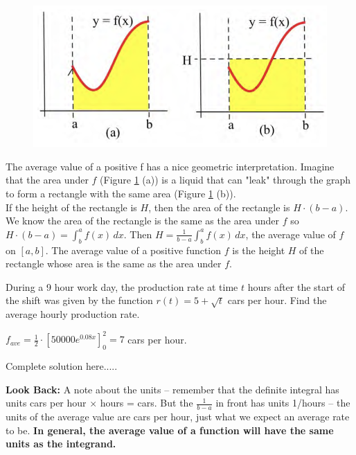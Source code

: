 \begin{figure}[h!]
    \centering
    \includegraphics[scale=0.5]{images/defIntgApp/geometricInterpret.png}
    \caption{}
    \label{fig:geometricInterpret}
\end{figure}

\noindent The average value of a positive f has a nice geometric interpretation. Imagine that the area under $f$ (Figure \ref{fig:geometricInterpret} (a)) is a liquid that can "leak" through the graph to form a rectangle with the same area (Figure \ref{fig:geometricInterpret} (b)).\\

\noindent If the height of the rectangle is $H$, then the area of the rectangle is $H\cdot (b-a)$. We know the area of the rectangle is the same as the area under $f$ so $H\cdot (b-a)=\displaystyle\int_b^a f(x)\,dx$. Then $H=\displaystyle \frac{1}{b-a}\int_b^a f(x)\,dx$, the average value of $f$ on $[a,b]$. The average value of a positive function $f$ is the height $H$ of the rectangle whose area is the same as the area under $f$.

\begin{example}
During a 9 hour work day, the production rate at time $t$ hours after the start of the shift was given by the function $r(t)=5+\sqrt{t}$ cars per hour. Find the average hourly production rate.
    \begin{sol}
    $f_{ave}=\displaystyle\frac{1}{2}\cdot \left[50000e^{0.08x}\right]_0^2= 7$ cars per hour.
    \end{sol}
    \begin{solL}
    Complete solution here.....
    
    \end{solL}
    
\end{example}
\newpage
\noindent \textbf{Look Back:} A note about the units – remember that the definite integral has units cars per hour $\times$ hours = cars. But the $\displaystyle\frac{1}{b-a}$ in front has units 1/hours – the units of the average value are cars per hour, just what we expect an average rate to be. \textbf{In general, the average value of a function will have the same units as the integrand.}

